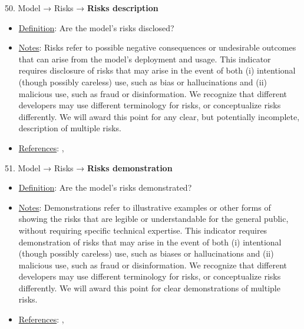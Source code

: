 50. Model → Risks → \textbf{Risks description}
\vspace{-\parskip}
\begin{itemize}
	\item
	\underline{Definition}: Are the model's risks disclosed?
	\item
	\underline{Notes}: Risks refer to possible negative consequences or undesirable outcomes that can arise from the model's deployment and usage. This indicator requires disclosure of risks that may arise in the event of both (i) intentional (though possibly careless) use, such as bias or hallucinations and (ii) malicious use, such as fraud or disinformation. We recognize that different developers may use different terminology for risks, or conceptualize risks differently. We will award this point for any clear, but potentially incomplete, description of multiple risks.
	\item
	\underline{References}: \citet{solaiman2023evaluating}, \citet{weidinger2021ethical}
\end{itemize}


51. Model → Risks → \textbf{Risks demonstration}
\vspace{-\parskip}
\begin{itemize}
	\item
	\underline{Definition}: Are the model’s risks demonstrated?
	\item
	\underline{Notes}: Demonstrations refer to illustrative examples or other forms of showing the risks that are legible or understandable for the general public, without requiring specific technical expertise. This indicator requires demonstration of risks that may arise in the event of both (i) intentional (though possibly careless) use, such as biases or hallucinations and (ii) malicious use, such as fraud or disinformation. We recognize that different developers may use different terminology for risks, or conceptualize risks differently. We will award this point for clear demonstrations of multiple risks.
	\item
	\underline{References}: \citet{solaiman2023evaluating}, \citet{weidinger2021ethical}
\end{itemize}


